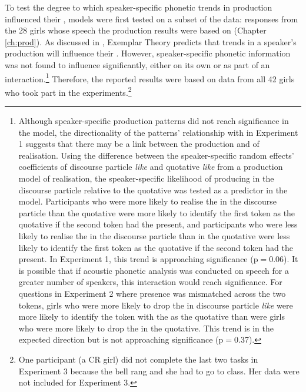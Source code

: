 To test the degree to which speaker-specific phonetic trends in production influenced their , models were first tested on a subset of the data: responses from the 28 girls whose speech the production results were based on (Chapter \ref{ch:prod}). As discussed in , Exemplar Theory predicts that trends in a speaker's production will influence their . However, speaker-specific phonetic information was not found to influence  significantly, either on its own or as part of an interaction.\footnote{Although speaker-specific production patterns did not reach significance in the model, the directionality of the patterns' relationship with  in Experiment 1 suggests that there may be a link between the production and  of  realisation. Using the difference between the speaker-specific random effects' coefficients of discourse particle \textit{like} and quotative \textit{like} from a production model of  realisation, the speaker-specific likelihood of producing  in the discourse particle relative to the quotative was tested as a predictor in the  model. Participants who were more likely to realise the  in the discourse particle than the quotative were more likely to identify the first token as the quotative if the second token had the  present, and participants who were less likely to realise the  in the discourse particle than in the quotative were less likely to identify the first token as the quotative if the second token had the  present. In Experiment 1, this trend is approaching significance (p$=$0.06). It is possible that if acoustic phonetic analysis was conducted on speech for a greater number of speakers, this interaction would reach significance. For questions in Experiment 2 where  presence was mismatched across the two tokens, girls who were more likely to drop the  in discourse particle \textit{like} were more likely to identify the token with the  as the quotative than were girls who were more likely to drop the  in the quotative. This trend is in the expected direction but is not approaching significance (p$=$0.37).} Therefore, the reported results were based on data from all 42 girls who took part in the experiments.\footnote{One participant (a CR girl) did not complete the last two tasks in Experiment 3 because the bell rang and she had to go to class. Her data were not included for Experiment 3.} 
